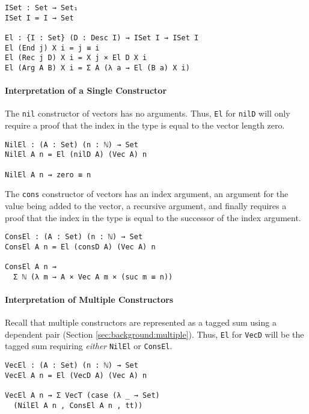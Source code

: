 \documentclass[preprint,nonatbib]{sigplanconf}
\newcommand{\refsec}[1]{Section \ref{sec:#1}}
\begin{document}
\begin{verbatim}
ISet : Set → Set₁
ISet I = I → Set

El : {I : Set} (D : Desc I) → ISet I → ISet I
El (End j) X i = j ≡ i
El (Rec j D) X i = X j × El D X i
El (Arg A B) X i = Σ A (λ a → El (B a) X i)
\end{verbatim}

\paragraph{Interpretation of a Single Constructor}

The {\tt nil} constructor of vectors has no arguments. Thus,
{\tt El} for {\tt nilD} will only require a proof that the index in
the type is equal to the vector length zero.

\begin{verbatim}
NilEl : (A : Set) (n : ℕ) → Set
NilEl A n = El (nilD A) (Vec A) n

NilEl A n ⇝ zero ≡ n
\end{verbatim}

The {\tt cons} constructor of vectors has an index argument, an
argument for the value being added to the vector, a recursive
argument, and finally requires a proof that the index in the type is
equal to the successor of the index argument.

\begin{verbatim}
ConsEl : (A : Set) (n : ℕ) → Set
ConsEl A n = El (consD A) (Vec A) n

ConsEl A n ⇝
  Σ ℕ (λ m → A × Vec A m × (suc m ≡ n))
\end{verbatim}

\paragraph{Interpretation of Multiple Constructors}

Recall that multiple constructors are represented as a tagged sum
using a dependent pair (\refsec{background:multiple}). Thus,
{\tt El} for {\tt VecD} will be the tagged sum requiring
{\it either} {\tt NilEl} or {\tt ConsEl}.

\begin{verbatim}
VecEl : (A : Set) (n : ℕ) → Set
VecEl A n = El (VecD A) (Vec A) n

VecEl A n ⇝ Σ VecT (case (λ _ → Set)
  (NilEl A n , ConsEl A n , tt))
\end{verbatim}
\end{document}
